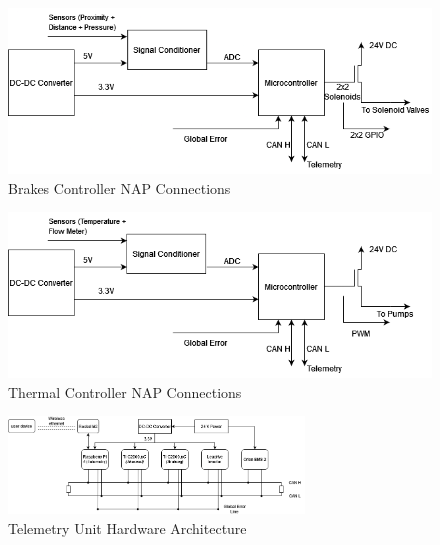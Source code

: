\begin{enumerate}
    \begin{figure}[H]
        \centering
        \includegraphics[width=0.6\linewidth]{texfiles/elec/eimg/Brakesystems}
        \caption{Brakes Controller NAP Connections} 
        \label{fig:Brakes Controller NAP Connections}
    \end{figure}
 \begin{figure}[H]
        \centering
        \includegraphics[width=0.6\linewidth]{texfiles/elec/eimg/thermalsystems}
        \caption{Thermal Controller NAP Connections}
        \label{fig:Thermal Controller NAP Connections}
    \end{figure}
 \begin{figure}[H]
        \centering
        \includegraphics[width=0.7\textwidth]{texfiles/elec/eimg/telemetrysystems}
        \caption{Telemetry Unit Hardware Architecture}
        \label{fig:Telemetry Unit Hardware Architecture}
    \end{figure}


\end{enumerate}
